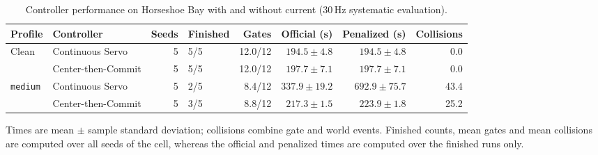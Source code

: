 \begin{table}[t]
\centering
\caption{Controller performance on Horseshoe Bay with and without current ($30$\,Hz systematic evaluation).}
\label{tab:currents}
\mratablestyle
\begin{tabular}{@{}llrlrrrr@{}}
\toprule
Profile & Controller & Seeds & Finished & Gates & Official (s) & Penalized (s) & Collisions \\
\midrule
\multirow{2}{*}{Clean}
 & Continuous Servo   & 5 & 5/5 & 12.0/12 & $194.5\pm4.8$ & $194.5\pm4.8$ & 0.0 \\
 & Center-then-Commit & 5 & 5/5 & 12.0/12 & $197.7\pm7.1$ & $197.7\pm7.1$ & 0.0 \\
\midrule
\multirow{2}{*}{\texttt{medium}}
 & Continuous Servo   & 5 & 2/5 & 8.4/12 & $337.9\pm19.2$ & $692.9\pm75.7$ & 43.4 \\
 & Center-then-Commit & 5 & 3/5 & 8.8/12 & $217.3\pm1.5$ & $223.9\pm1.8$ & 25.2 \\
\bottomrule
\end{tabular}
\mratablenote
Times are mean $\pm$ sample standard deviation; collisions combine gate and world
events. Finished counts, mean gates and mean collisions are computed over all seeds
of the cell, whereas the official and penalized times are computed over the finished
runs only.
\end{table}
